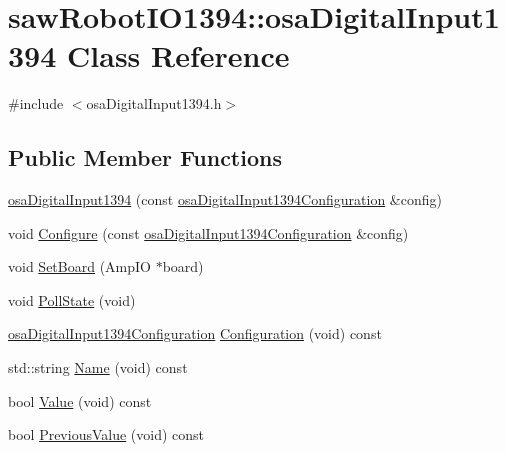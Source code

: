 \hypertarget{classsaw_robot_i_o1394_1_1osa_digital_input1394}{}\section{saw\+Robot\+I\+O1394\+:\+:osa\+Digital\+Input1394 Class Reference}
\label{classsaw_robot_i_o1394_1_1osa_digital_input1394}


{\ttfamily \#include $<$osa\+Digital\+Input1394.\+h$>$}

\subsection*{Public Member Functions}
\begin{DoxyCompactItemize}
\item 
\hyperlink{classsaw_robot_i_o1394_1_1osa_digital_input1394_a1de20d07136b2eaf707ede2d406720dd}{osa\+Digital\+Input1394} (const \hyperlink{structsaw_robot_i_o1394_1_1osa_digital_input1394_configuration}{osa\+Digital\+Input1394\+Configuration} \&config)
\item 
void \hyperlink{classsaw_robot_i_o1394_1_1osa_digital_input1394_ad9e3c775df55a9e2abb465f4545a8549}{Configure} (const \hyperlink{structsaw_robot_i_o1394_1_1osa_digital_input1394_configuration}{osa\+Digital\+Input1394\+Configuration} \&config)
\item 
void \hyperlink{classsaw_robot_i_o1394_1_1osa_digital_input1394_a388dfbcdba37ad2f5eabfd3941454996}{Set\+Board} (Amp\+I\+O $\ast$board)
\item 
void \hyperlink{classsaw_robot_i_o1394_1_1osa_digital_input1394_acb437ffaafcbed80862b306eb2b4ace7}{Poll\+State} (void)
\item 
\hyperlink{structsaw_robot_i_o1394_1_1osa_digital_input1394_configuration}{osa\+Digital\+Input1394\+Configuration} \hyperlink{classsaw_robot_i_o1394_1_1osa_digital_input1394_a595d4af2e32df6bde45923e11d5c578f}{Configuration} (void) const 
\item 
std\+::string \hyperlink{classsaw_robot_i_o1394_1_1osa_digital_input1394_ae70c925cef3a3cd9994968d956ec49e3}{Name} (void) const 
\item 
bool \hyperlink{classsaw_robot_i_o1394_1_1osa_digital_input1394_a4ec5c3ec935ff28717d46c4c0d21f4c4}{Value} (void) const 
\item 
bool \hyperlink{classsaw_robot_i_o1394_1_1osa_digital_input1394_aea5a53a644461e57f13e20be4f2ca467}{Previous\+Value} (void) const 
\end{DoxyCompactItemize}
